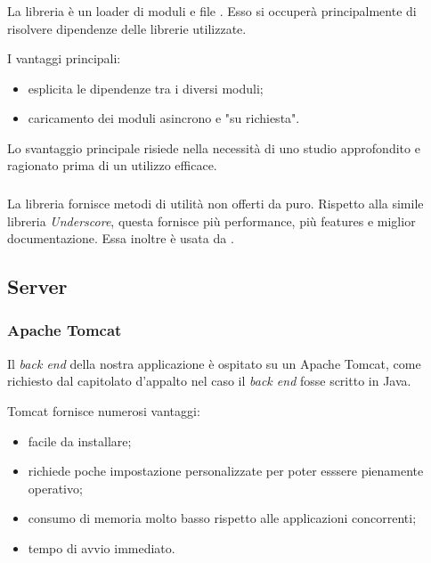 \subsubsection{\requirejs}
La libreria \requirejs{} è un loader di moduli e file \js{}. Esso si occuperà principalmente di risolvere dipendenze delle librerie \js{} utilizzate.

I vantaggi principali:
\begin{itemize}
	\item esplicita le dipendenze tra i diversi moduli;
	\item caricamento dei moduli asincrono e "su richiesta".
\end{itemize}

Lo svantaggio principale risiede nella necessità di uno studio approfondito e ragionato prima di un utilizzo efficace.

\subsubsection{\lodash}
La libreria \lodash{} fornisce metodi di utilità non offerti da \js{} puro. Rispetto alla simile libreria \emph{Underscore}, questa fornisce più performance, più features e miglior documentazione. Essa inoltre è usata da \jointjs.



\subsection{Server}

\subsubsection{Apache Tomcat}
Il \emph{back end} della nostra applicazione è ospitato su un  Apache Tomcat, come richiesto dal capitolato d'appalto nel caso il \emph{back end} fosse scritto in Java.

Tomcat fornisce numerosi vantaggi:
\begin{itemize}
	\item facile da installare;
	\item richiede poche impostazione personalizzate per poter esssere pienamente operativo;
	\item consumo di memoria molto basso rispetto alle applicazioni concorrenti;
	\item tempo di avvio immediato. 
\end{itemize}

